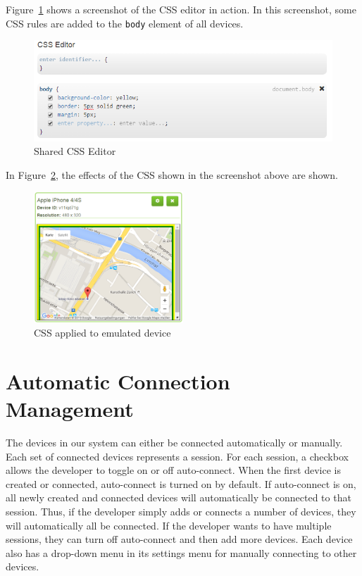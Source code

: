 Figure~\ref{fig:css_editor} shows a screenshot of the CSS editor in action. In this screenshot, some CSS rules are added to the \lstinline|body| element of all devices.

\begin{figure}[H]
  \centering
    \includegraphics[width=1.0\textwidth]{images/screenshots/css_editor.png}
	\caption[Screenshot: CSS editor]{Shared CSS Editor}
	\label{fig:css_editor}
\end{figure}

In Figure~\ref{fig:css_applied}, the effects of the CSS shown in the screenshot above are shown. 

\begin{figure}[H]
  \centering
    \includegraphics[width=0.5\textwidth]{images/screenshots/emulated_device_4.png}
	\caption[Screenshot: CSS effects]{CSS applied to emulated device}
	\label{fig:css_applied}
\end{figure}

\section{Automatic Connection Management}

The devices in our system can either be connected automatically or manually. Each set of connected devices represents a session. For each session, a checkbox allows the developer to toggle on or off auto-connect. When the first device is created or connected, auto-connect is turned on by default. If auto-connect is on, all newly created and connected devices will automatically be connected to that session. Thus, if the developer simply adds or connects a number of devices, they will automatically all be connected. If the developer wants to have multiple sessions, they can turn off auto-connect and then add more devices. Each device also has a drop-down menu in its settings menu for manually connecting to other devices. 

